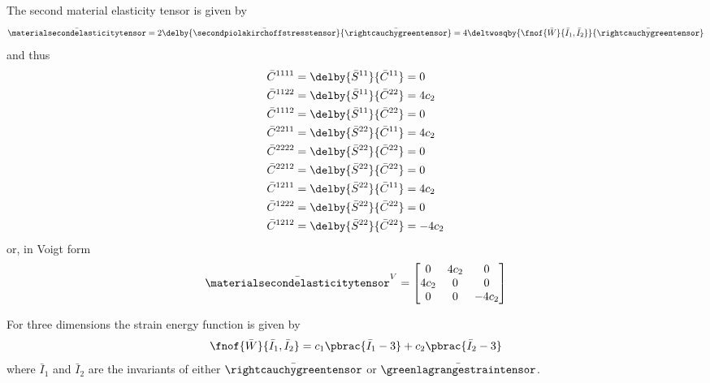 The second material elasticity tensor is given by
\begin{equation}
  \bar{\materialsecondelasticitytensor}=2\delby{\bar{\secondpiolakirchoffstresstensor}}{\bar{\rightcauchygreentensor}}=4\deltwosqby{\fnof{\bar{W}}{\bar{I}_{1},\bar{I}_{2}}}{\bar{\rightcauchygreentensor}}\\
\end{equation}
and thus
\begin{equation}
  \begin{split}
    \bar{C}^{1111}&=\delby{\bar{S}^{11}}{\bar{C}^{11}}=0\\
    \bar{C}^{1122}&=\delby{\bar{S}^{11}}{\bar{C}^{22}}=4c_{2}\\
    \bar{C}^{1112}&=\delby{\bar{S}^{11}}{\bar{C}^{22}}=0\\
    \bar{C}^{2211}&=\delby{\bar{S}^{22}}{\bar{C}^{11}}=4c_{2}\\
    \bar{C}^{2222}&=\delby{\bar{S}^{22}}{\bar{C}^{22}}=0\\
    \bar{C}^{2212}&=\delby{\bar{S}^{22}}{\bar{C}^{22}}=0\\
    \bar{C}^{1211}&=\delby{\bar{S}^{22}}{\bar{C}^{11}}=4c_{2}\\
    \bar{C}^{1222}&=\delby{\bar{S}^{22}}{\bar{C}^{22}}=0\\
    \bar{C}^{1212}&=\delby{\bar{S}^{22}}{\bar{C}^{22}}=-4c_{2}\\
  \end{split}
\end{equation}
or, in Voigt form
\begin{equation}
  \bar{\materialsecondelasticitytensor}^{V}=\begin{bmatrix}
  0 & 4c_{2} & 0 \\
  4c_{2} & 0 & 0 \\
  0 & 0 & -4c_{2}
  \end{bmatrix}
\end{equation}

For three dimensions the strain energy function is given by
\begin{equation}
  \fnof{\bar{W}}{\bar{I}_{1},\bar{I}_{2}}=c_{1}\pbrac{\bar{I}_{1}-3}+c_{2}\pbrac{\bar{I}_{2}-3}
\end{equation}
where $\bar{I}_{1}$ and $\bar{I}_{2}$ are the invariants of either $\bar{\rightcauchygreentensor}$ or $\bar{\greenlagrangestraintensor}$.

